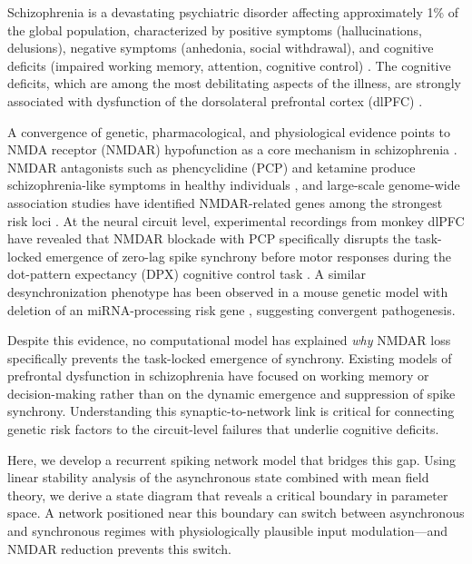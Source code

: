 \documentclass[11pt]{article}
\begin{document}
Schizophrenia is a devastating psychiatric disorder affecting approximately 1\% of the global population, characterized by positive symptoms (hallucinations, delusions), negative symptoms (anhedonia, social withdrawal), and cognitive deficits (impaired working memory, attention, cognitive control) \citep{javitt2012nmda}. The cognitive deficits, which are among the most debilitating aspects of the illness, are strongly associated with dysfunction of the dorsolateral prefrontal cortex (dlPFC) \citep{gonzalez2014prefrontal, lewis2012cortical}.

A convergence of genetic, pharmacological, and physiological evidence points to NMDA receptor (NMDAR) hypofunction as a core mechanism in schizophrenia \citep{javitt2012nmda, schizophrenia2014biological, ripke2022mapping}. NMDAR antagonists such as phencyclidine (PCP) and ketamine produce schizophrenia-like symptoms in healthy individuals \citep{krystal1994subanesthetic}, and large-scale genome-wide association studies have identified NMDAR-related genes among the strongest risk loci \citep{ripke2022mapping}. At the neural circuit level, experimental recordings from monkey dlPFC have revealed that NMDAR blockade with PCP specifically disrupts the task-locked emergence of zero-lag spike synchrony before motor responses during the dot-pattern expectancy (DPX) cognitive control task \citep{zick2018blocking, zick2021spike}. A similar desynchronization phenotype has been observed in a mouse genetic model with deletion of an miRNA-processing risk gene \citep{kummerfeld2020model}, suggesting convergent pathogenesis.

Despite this evidence, no computational model has explained \textit{why} NMDAR loss specifically prevents the task-locked emergence of synchrony. Existing models of prefrontal dysfunction in schizophrenia have focused on working memory \citep{compte2000synaptic, murray2014linking} or decision-making \citep{wang2002probabilistic, wong2006recurrent} rather than on the dynamic emergence and suppression of spike synchrony. Understanding this synaptic-to-network link is critical for connecting genetic risk factors to the circuit-level failures that underlie cognitive deficits.

Here, we develop a recurrent spiking network model that bridges this gap. Using linear stability analysis of the asynchronous state combined with mean field theory, we derive a state diagram that reveals a critical boundary in parameter space. A network positioned near this boundary can switch between asynchronous and synchronous regimes with physiologically plausible input modulation---and NMDAR reduction prevents this switch.
\end{document}
